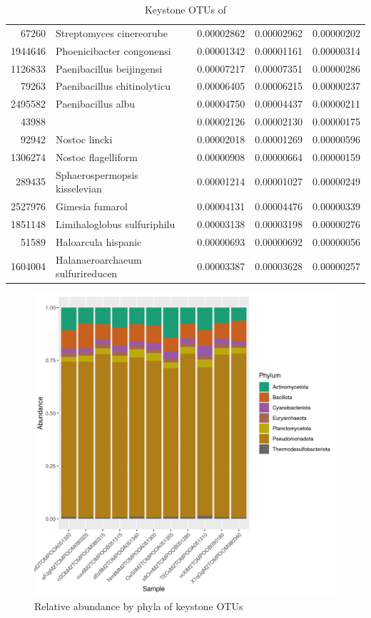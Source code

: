 \begin{table}[ht]
\begin{tabular}{rlrrr}
  67260 & Streptomyces cinereorube & 0.00002862 & 0.00002962 & 0.00000202 \\ 
  1944646 & Phoenicibacter congonensi & 0.00001342 & 0.00001161 & 0.00000314 \\ 
  1126833 & Paenibacillus beijingensi & 0.00007217 & 0.00007351 & 0.00000286 \\ 
  79263 & Paenibacillus chitinolyticu & 0.00006405 & 0.00006215 & 0.00000237 \\ 
  2495582 & Paenibacillus albu & 0.00004750 & 0.00004437 & 0.00000211 \\ 
  43988 &   & 0.00002126 & 0.00002130 & 0.00000175 \\ 
  92942 & Nostoc lincki & 0.00002018 & 0.00001269 & 0.00000596 \\ 
  1306274 & Nostoc flagelliform & 0.00000908 & 0.00000664 & 0.00000159 \\ 
  289435 & Sphaerospermopsis kisselevian & 0.00001214 & 0.00001027 & 0.00000249 \\ 
  2527976 & Gimesia fumarol & 0.00004131 & 0.00004476 & 0.00000339 \\ 
  1851148 & Limihaloglobus sulfuriphilu & 0.00003138 & 0.00003198 & 0.00000276 \\ 
  51589 & Haloarcula hispanic & 0.00000693 & 0.00000692 & 0.00000056 \\ 
  1604004 & Halanaeroarchaeum sulfurireducen & 0.00003387 & 0.00003628 & 0.00000257 \\ 
   \hline
\end{tabular}
\caption{Keystone OTUs of } 
\end{table}
\begin{figure}
\centering
\includegraphics[scale = 0.8]{tomate_aleatorio1_1.csv_relative_abundance_Phylum.png}
\caption{Relative abundance by phyla of keystone OTUs }
\label{fig:tomate_aleatorio1_1.csv_phyla}
\end{figure}
